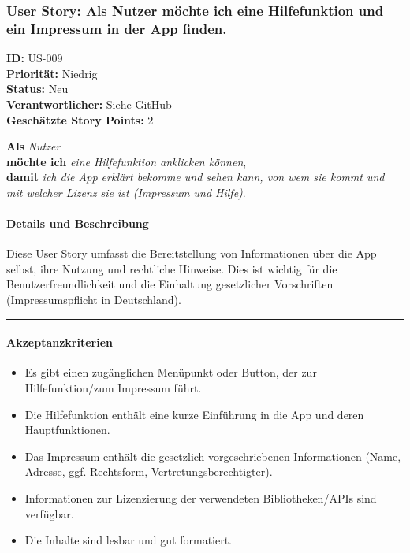 \documentclass{article}
\begin{document}
\clearpage

\subsubsection{User Story: Als Nutzer möchte ich eine Hilfefunktion und ein Impressum in der App finden.}
\textcolor{storyblue}{\textbf{ID:}} US-009 \\
\textcolor{storyblue}{\textbf{Priorität:}} Niedrig \\
\textcolor{storyblue}{\textbf{Status:}} Neu \\
\textcolor{storyblue}{\textbf{Verantwortlicher:}} Siehe GitHub \\
\textcolor{storyblue}{\textbf{Geschätzte Story Points:}} 2

\vspace{0.5em}

\textcolor{storygreen}{\textbf{Als}} \textit{Nutzer} \\
\textcolor{storygreen}{\textbf{möchte ich}} \textit{eine Hilfefunktion anklicken können}, \\
\textcolor{storygreen}{\textbf{damit}} \textit{ich die App erklärt bekomme und sehen kann, von wem sie kommt und mit welcher Lizenz sie ist (Impressum und Hilfe)}.

\vspace{1em}

\paragraph{Details und Beschreibung}
Diese User Story umfasst die Bereitstellung von Informationen über die App selbst, ihre Nutzung und rechtliche Hinweise. Dies ist wichtig für die Benutzerfreundlichkeit und die Einhaltung gesetzlicher Vorschriften (Impressumspflicht in Deutschland).

\vspace{0.5em}
\hrule

\paragraph{Akzeptanzkriterien}
\begin{itemize}
    \item Es gibt einen zugänglichen Menüpunkt oder Button, der zur Hilfefunktion/zum Impressum führt.
    \item Die Hilfefunktion enthält eine kurze Einführung in die App und deren Hauptfunktionen.
    \item Das Impressum enthält die gesetzlich vorgeschriebenen Informationen (Name, Adresse, ggf. Rechtsform, Vertretungsberechtigter).
    \item Informationen zur Lizenzierung der verwendeten Bibliotheken/APIs sind verfügbar.
    \item Die Inhalte sind lesbar und gut formatiert.
\end{itemize}
\end{document}
